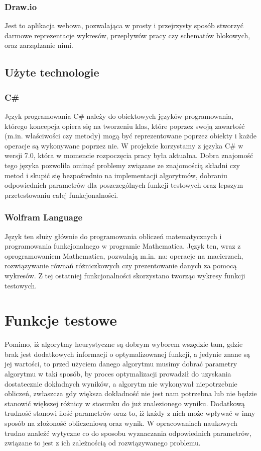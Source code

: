 \documentclass[twoside]{projektInzynierskiMS1}
\newcommand{\si}{ś}
\begin{document}
\subsubsection{Draw.io}
Jest to aplikacja webowa, pozwalająca w prosty i przejrzysty sposób stworzyć darmowe reprezentacje wykresów, przepływów pracy czy schematów blokowych, oraz zarządzanie nimi. 
	
	\subsection{Użyte technologie}
	\subsubsection{C\#}
Język programowania C\# należy do obiektowych języków programowania, którego koncepcja opiera się na tworzeniu klas, które poprzez swoją zawarto\si ć (m.in. wła\si ciwo\si ci czy metody) mogą być reprezentowane poprzez obiekty i każde operacje są wykonywane poprzez nie. W projekcie korzystamy z języka C\# w wersji 7.0, która w momencie rozpoczęcia pracy była aktualna. Dobra znajomo\si ć tego języka pozwoliła ominąć problemy związane ze znajomo\si cią składni czy metod i skupić się bezpo\si rednio na implementacji algorytmów, dobraniu odpowiednich parametrów dla poszczególnych funkcji testowych oraz lepszym przetestowaniu całej funkcjonalno\si ci.

\subsubsection{Wolfram Language}
Język ten służy głównie do programowania obliczeń matematycznych i programowania funkcjonalnego w programie Mathematica. Język ten, wraz z oprogramowaniem Mathematica, pozwalają m.in. na: operacje na macierzach, rozwiązywanie równań różniczkowych czy prezentowanie danych za pomocą wykresów. Z tej ostatniej funkcjonalno\si ci skorzystano tworząc wykresy funkcji testowych.

\section{Funkcje testowe}
Pomimo, iż algorytmy heurystyczne są dobrym wyborem wszędzie tam, gdzie brak jest dodatkowych informacji o optymalizowanej funkcji, a jedynie znane są jej warto\si ci, to przed użyciem danego algorytmu musimy dobrać parametry algorytmu w taki sposób, by proces optymalizacji prowadził do uzyskania dostatecznie dokładnych wyników, a algorytm nie wykonywał niepotrzebnie obliczeń, zwłaszcza gdy większa dokładno\si ć nie jest nam potrzebna lub nie będzie stanowić większej różnicy w stosunku do już znalezionego wyniku. Dodatkową trudno\si ć stanowi ilo\si ć parametrów oraz to, iż każdy z nich może wpływać w inny sposób na złożono\si ć obliczeniową oraz wynik. W opracowaniach naukowych trudno znaleźć wytyczne co do sposobu wyznaczania odpowiednich parametrów, związane to jest z ich zależno\si cią od rozwiązywanego problemu. \\
\end{document}
